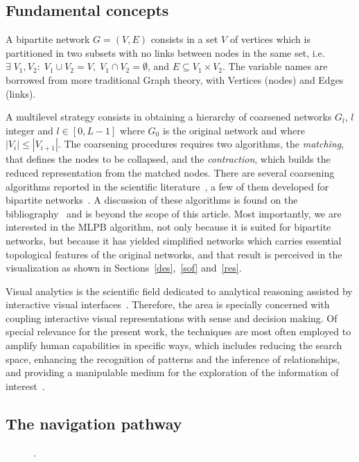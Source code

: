 \documentclass[runningheads]{llncs}
\begin{document}
\subsection{Fundamental concepts}\label{bac}
A bipartite network $G=(V,E)$ consists in a set $V$ of vertices which is partitioned in two subsets
with no links between nodes in the same set, i.e. $\exists\; V_1, V_2:\; V_1\cup V_2 = V,\;V_1\cap V_2 = \emptyset$, and $E\subseteq V_1 \times V_2$.
The variable names are borrowed from more traditional Graph theory, with Vertices (nodes) and Edges (links).

A multilevel strategy consists in obtaining a hierarchy of coarsened networks $G_l$, $l$ integer and $l \in [0,L-1]$ where $G_0$ is the original network
and where $|V_i| \leq |V_{i+1}|$.
The coarsening procedures requires two algorithms, the \emph{matching}, that defines the nodes to be collapsed, and the \emph{contraction}, which builds the reduced representation
from the matched nodes.
There are several coarsening algorithms reported in the scientific literature~\cite{}, a few of them
developed for bipartite networks~\cite{}.
A discussion of these algorithms is found on the bibliography~\cite{} and is beyond the scope of this article.
Most importantly, we are interested in the MLPB algorithm, not only because it is suited for bipartite networks,
but because it has yielded simplified networks which carries essential topological features of the original networks,
and that result is perceived in the visualization as shown in Sections~\ref{des},~\ref{sof} and~\ref{res}.

Visual analytics is the scientific field dedicated to analytical reasoning assisted by interactive visual interfaces~\cite{}.
Therefore, the area is specially concerned with coupling interactive visual representations with sense and decision making.
Of special relevance for the present work, the techniques are most often employed to amplify human capabilities in specific ways,
which includes reducing the search space, enhancing the recognition of patterns and the inference of relationships,
and providing a manipulable medium for the exploration of the information of interest~\cite{}.

\subsection{The navigation pathway}



\begin{figure}[!h]\centering
  \caption{.
  }\label{fig:glob}
\end{figure}
\end{document}
